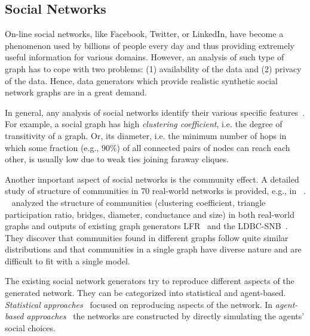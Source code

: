 \subsection{Social Networks}
\label{sec:generators_socialnetworks}

On-line social networks, like Facebook, Twitter, or LinkedIn, have become a
phenomenon used by billions of people every day and thus providing extremely
useful information for various domains. However, an analysis of such type of
graph has to cope with two problems: (1) availability of the data and (2)
privacy of the data. Hence, data generators which provide realistic synthetic
social network graphs are in a great demand.

In general, any analysis of social networks identify their various specific
features~\cite{Chakrabarti:2006:GML:1132952.1132954}. For example, a social
graph has high \emph{clustering coefficient}, i.e. the degree of transitivity of
a graph. Or, its diameter, i.e. the minimum number of hops in which some
fraction (e.g., 90\%) of all connected pairs of nodes can reach each other, is
usually low due to weak ties joining faraway cliques.

Another important aspect
of social networks is the community effect. A detailed study of structure of
communities in 70 real-world networks is provided, e.g., in
~\cite{Leskovec:2008:SPC:1367497.1367591}. 
~\cite{Prat-Perez:2014:CSS:2621934.2621942} analyzed the structure of
communities (clustering coefficient, triangle participation ratio, bridges,
diameter, conductance and size) in both real-world graphs and outputs of existing graph
generators LFR~\cite{PhysRevE.78.046110} and the
LDBC-SNB~\cite{Erling:2015:LSN:2723372.2742786}. They discover that communities found in different graphs follow quite similar distributions and that communities in a single graph have diverse nature and are difficult to fit with a single model.

The existing social network generators try to reproduce different aspects of the
generated network. They can be categorized into statistical and agent-based.
\emph{Statistical
approaches}~\cite{PhysRevE.78.046110,Yao2011,Armstrong:2013:LDB:2463676.2465296,Pham2013,Sukthankar-SocialInfo2014,Erling:2015:LSN:2723372.2742786,Nettleton2016}
focused on reproducing aspects of the network. In \emph{agent-based
approaches}~\cite{Barrett:2009:GAL:1995456.1995598,Bernstein:2013:SAS:2499604.2499609}
the networks are constructed by directly simulating the agents' social choices.

